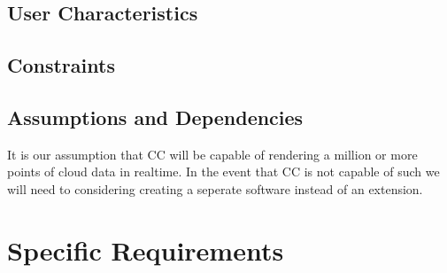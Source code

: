\documentclass[titlepage]{article}
\begin{document}
\subsection{User Characteristics}

\subsection{Constraints}

\subsection{Assumptions and Dependencies}

It is our assumption that CC will be capable of rendering a million or more points of cloud data in realtime.
In the event that CC is not capable of such we will need to considering creating a seperate software instead of an extension.

\section{Specific Requirements}
\end{document}

